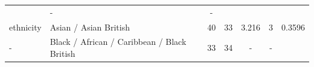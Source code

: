 \documentclass[]{article}
\theoremstyle{definition}
\theoremstyle{definition}
\theoremstyle{definition}
\theoremstyle{remark}
\begin{document}
\begin{longtable}[]{@{}llccccc@{}}
\begin{minipage}[t]{0.07\columnwidth}
\end{minipage} & \begin{minipage}[t]{0.06\columnwidth}\centering\strut
-\strut
\end{minipage} & \begin{minipage}[t]{0.06\columnwidth}\centering\strut
-\strut
\end{minipage}\tabularnewline
\begin{minipage}[t]{0.09\columnwidth}\raggedright\strut
ethnicity\strut
\end{minipage} & \begin{minipage}[t]{0.24\columnwidth}\raggedright\strut
Asian / Asian British\strut
\end{minipage} & \begin{minipage}[t]{0.16\columnwidth}\centering\strut
40\strut
\end{minipage} & \begin{minipage}[t]{0.12\columnwidth}\centering\strut
33\strut
\end{minipage} & \begin{minipage}[t]{0.07\columnwidth}\centering\strut
3.216\strut
\end{minipage} & \begin{minipage}[t]{0.06\columnwidth}\centering\strut
3\strut
\end{minipage} & \begin{minipage}[t]{0.06\columnwidth}\centering\strut
0.3596\strut
\end{minipage}\tabularnewline
\begin{minipage}[t]{0.09\columnwidth}\raggedright\strut
-\strut
\end{minipage} & \begin{minipage}[t]{0.24\columnwidth}\raggedright\strut
Black / African / Caribbean / Black British\strut
\end{minipage} & \begin{minipage}[t]{0.16\columnwidth}\centering\strut
33\strut
\end{minipage} & \begin{minipage}[t]{0.12\columnwidth}\centering\strut
34\strut
\end{minipage} & \begin{minipage}[t]{0.07\columnwidth}\centering\strut
-\strut
\end{minipage} & \begin{minipage}[t]{0.06\columnwidth}\centering\strut
-\strut
\end{minipage} & \begin{minipage}[t]{0.06\columnwidth}\centering\strut

\end{minipage}
\end{longtable}
\end{document}
